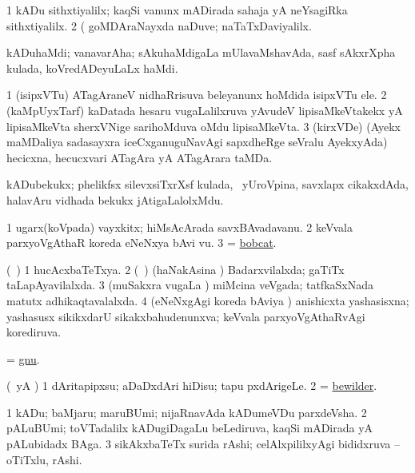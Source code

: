 \noindent 
\gl{\pagu}
\bmng
\bnum
\num{1}  kADu sithxtiyalilx; kaqSi \mo vanunx mADirada sahaja yA neYsagiRka sithxtiyalilx. 
\num{2}  (  goMDAraNayxda naDuve; naTaTxDaviyalilx. 
\enum
\emng
\eentry

\bentry
{}
\gl{\nA}
\bmng
kADuhaMdi; vanavarAha; sAkuhaMdigaLa mUlavaMshavAda, sasf sAkxrXpha kulada, koVredADeyuLaLx haMdi. 
\emng
\eentry

\bentry
{}
\gl{\nA}
\bmng
\bnum
\num{1} (isipxVTu) ATagAraneV nidhaRrisuva beleyanunx hoMdida isipxVTu ele. 
\num{2} (kaMpUyxTarf) kaDatada hesaru \mo vugaLalilxruva yAvudeV lipisaMkeVtakekx yA lipisaMkeVta sherxVNige sarihoMduva oMdu lipisaMkeVta. 
\num{3} (kirxVDe) (Ayekx maMDaliya sadasayxra iceCxganuguNavAgi sapxdheRge seVralu AyekxyAda) hecicxna, hecucxvari ATagAra yA ATagArara taMDa. 
\enum
\emng
\eentry

\bentry
{}
\gl{\nA}
\bmng
kADubekukx; phelikfsx silevxsiTxrXsf kulada, \kanmu\ yUroVpina, savxlapx cikakxdAda, halavAru vidhada bekukx jAtigaLalolxMdu. 
\emng
\eentry

\bentry
{}
\gl{\nA} 
\bmng
\bnum
\num{1} ugarx(koVpada) vayxkitx; hiMsAcArada savxBAvadavanu. 
\num{2} keVvala parxyoVgAthaR koreda eNeNxya bAvi \mo vu. 
\num{3} = \hyperref{kandict_b.pdf}{B}{bobcat}{bobcat}. 
\enum
\emng
\eentry

\bentry
{}
\gl{\gu}
\expl{}
\bmng
(\kanmu\ \ame) 
\bnum
\num{1} hucAcxbaTeTxya. 
\num{2} (\kanmu\ \ame) (haNakAsina \vi) Badarxvilalxda; gaTiTx taLapAyavilalxda. 
\num{3} (muSakxra \mo vugaLa \vi) miMcina veVgada; tatfkaSxNada matutx adhikaqtavalalxda. 
\num{4} (eNeNxgAgi koreda bAviya \vi) anishicxta yashasisxna; yashasusx sikikxdarU sikakxbahudenunxva; keVvala parxyoVgAthaRvAgi korediruva. 
\enum
\emng
\eentry

\bentry
{}
\gl{\nA}
\bmng
= \hyperref{kandict_g.pdf}{G}{gnu}{gnu}. 
\emng
\eentry

\bentry
{} 
\gl{\sakirx}
\expl{}
\bmng
(\pArxparx\ yA \kAparx) 
\bnum
\num{1} dAritapipxsu; aDaDxdAri hiDisu; tapu pxdArigeLe. 
\num{2} = \hyperref{kandict_b.pdf}{B}{bewilder}{bewilder}. 
\enum
\emng
\eentry

\bentry
{} 
\gl{\nA}
\expl{}
\bmng
\bnum
\num{1} kADu; baMjaru; maruBUmi; nijaRnavAda kADumeVDu parxdeVsha. 
\num{2} pALuBUmi; toVTadalilx kADugiDagaLu beLediruva, kaqSi mADirada yA pALubidadx BAga. 
\num{3} sikAkxbaTeTx surida rAshi; celAlxpililxyAgi bididxruva -- oTiTxlu, rAshi. 
\enum
\emng

